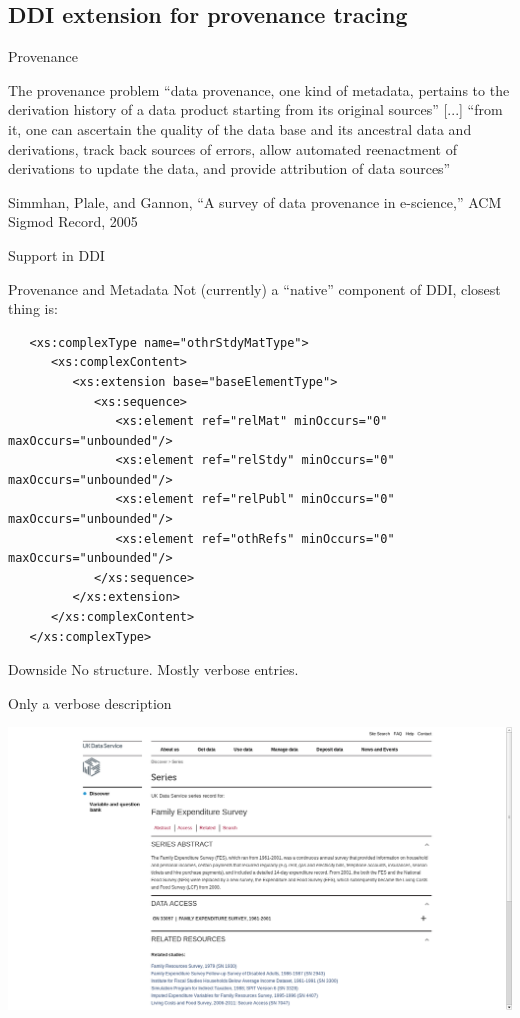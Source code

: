 \subsection[Provenance]{DDI extension for provenance tracing}
\begin{frame}{Provenance}
\begin{block}{The provenance problem}
``data provenance, one kind of metadata, pertains to the derivation history of a
data product starting from its original sources'' [...]  ``from it, one can ascertain
the quality of the data base and its ancestral data and derivations, track back sources
of errors, allow automated reenactment of derivations to update the data, and provide 
attribution of data sources'' 
\end{block}
{\tiny Simmhan, Plale, and Gannon, ``A survey of data provenance in e-science,'' ACM Sigmod Record, 2005}
\end{frame}

\begin{frame}[fragile]{Support in DDI}
\begin{block}{Provenance and Metadata}
Not (currently) a ``native'' component of DDI, closest thing is:
\begin{verbatim}
   <xs:complexType name="othrStdyMatType">
      <xs:complexContent>
         <xs:extension base="baseElementType">
            <xs:sequence>
               <xs:element ref="relMat" minOccurs="0" maxOccurs="unbounded"/>
               <xs:element ref="relStdy" minOccurs="0" maxOccurs="unbounded"/>
               <xs:element ref="relPubl" minOccurs="0" maxOccurs="unbounded"/>
               <xs:element ref="othRefs" minOccurs="0" maxOccurs="unbounded"/>
            </xs:sequence>
         </xs:extension>
      </xs:complexContent>
   </xs:complexType>
\end{verbatim}
\end{block}
\begin{block}{Downside}
No structure. Mostly verbose entries.
\end{block}
\end{frame}

\begin{frame}{Only a verbose description}
\begin{center}
\includegraphics[width=1\linewidth]{uk_data_archive}
\end{center}
\end{frame}

